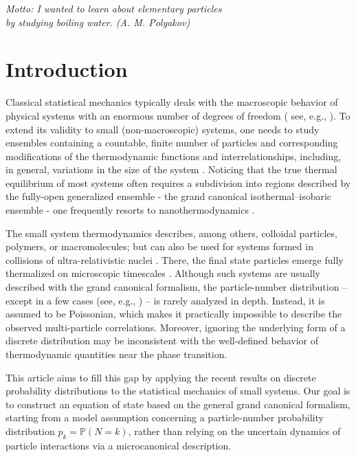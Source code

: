 \documentclass[a4paper,12pt]{amsart}
\theoremstyle{definition}
\theoremstyle{remark}
\begin{document}
\tableofcontents

\newpage
\begin{flushright}
{\it Motto: I wanted to learn about elementary particles \\
by studying boiling water.
(A. M. Polyakov)}  
\end{flushright}

\section{Introduction}

Classical statistical mechanics typically deals with the macroscopic behavior of physical systems with an enormous number of degrees of freedom ( see, e.g., \cite{Hill, Lanlif, BlanTh}). To extend its validity to small (non-macroscopic) systems, one needs to study ensembles containing a countable, finite number of particles and corresponding modifications of the thermodynamic functions and interrelationships, including, in general, variations in the size of the system \cite{Hill1962, Hill_small}. Noticing that the true thermal equilibrium of most systems often requires a subdivision into regions described by the fully-open generalized ensemble - the grand canonical isothermal–isobaric ensemble - one frequently resorts to nanothermodynamics \cite{chamberlin2020}.

The small system thermodynamics \cite{Hill_small} describes, among others, colloidal particles, polymers, or macromolecules; but can also be used for systems formed in collisions of ultra-relativistic nuclei \cite{Hagedorn:1985js, Csernai,  Rafelski:2015xej}. There, the final state particles emerge fully thermalized on microscopic timescales \cite{Baier:2000sb, Xu:2004mz, Pasechnik:2016wkt}. Although such systems are usually described with the grand canonical formalism, the particle-number distribution -- except in a few cases (see, e.g., \cite{Mrowczynski:1984tj, Gorenstein:2008nr}) -- is rarely analyzed in depth. Instead, it is assumed to be Poissonian, which makes it practically impossible to describe the observed multi-particle correlations.
Moreover, ignoring the underlying form of a discrete distribution may be inconsistent with the well-defined behavior of thermodynamic quantities near the phase transition. 

This article aims to fill this gap by applying the recent results on discrete probability distributions to the statistical mechanics of small systems.  Our goal is to construct an equation of state based on the general grand canonical formalism, starting from a model assumption concerning a particle-number probability distribution $p_k=\mathbb{P}(N\!=\!k)$, rather than relying on the uncertain dynamics of particle interactions via a microcanonical description.
\end{document}
